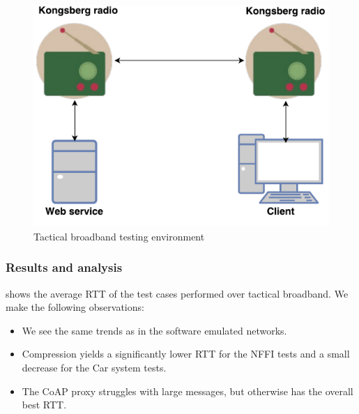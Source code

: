 \begin{figure}[h]
\centering
\includegraphics[scale=0.6]{images/radio_testing_environment.pdf}
\caption{Tactical broadband testing environment}
\label{figure-radio-testing-environment}
\end{figure}

\subsubsection{Results and analysis}

 shows the average RTT of the test cases
performed over tactical broadband. We make the following observations:

\begin{itemize}

    \item We see the same trends as in the software emulated networks.

    \item Compression yields a significantly lower RTT for the NFFI tests and a
    small decrease for the Car system tests.

    \item The CoAP proxy struggles with large messages, but otherwise has the
    overall best RTT.

\end{itemize}


